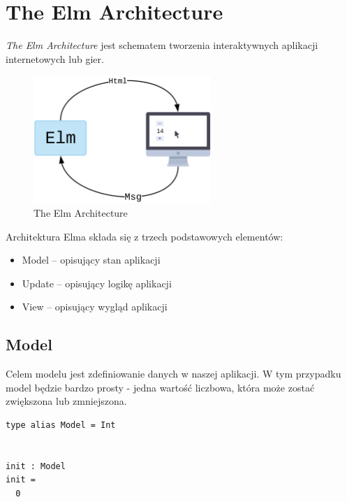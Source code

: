 \documentclass[twoside,a4paper]{report}
\begin{document}
\section{The Elm Architecture}
\textit{The Elm Architecture} jest schematem tworzenia interaktywnych aplikacji internetowych lub gier.
\begin{figure}[h]
    \centering
    \includegraphics[width=0.6\textwidth]{elm_arch.png}
    \caption{The Elm Architecture}
    \label{fig:elm_arch}
\end{figure}

Architektura Elma składa się z trzech podstawowych elementów:
\begin{itemize}
    \setlength\itemsep{-0.1em}
    \item Model -- opisujący stan aplikacji
    \item Update -- opisujący logikę aplikacji
    \item View -- opisujący wygląd aplikacji
\end{itemize}

\subsection{Model}
\begin{minipage}{.45\textwidth}
Celem modelu jest zdefiniowanie danych w naszej aplikacji. W tym przypadku model będzie bardzo prosty - jedna wartość liczbowa, która może zostać zwiększona lub zmniejszona.
\end{minipage}\hfill
\begin{minipage}{.45\textwidth}
\lstset{frame=single}
\begin{lstlisting}[caption={\textit{The Elm Architecture} - Model},label=kod:Model]
type alias Model = Int


init : Model
init =
  0
\end{lstlisting}
\end{minipage}\hfill
\end{document}
